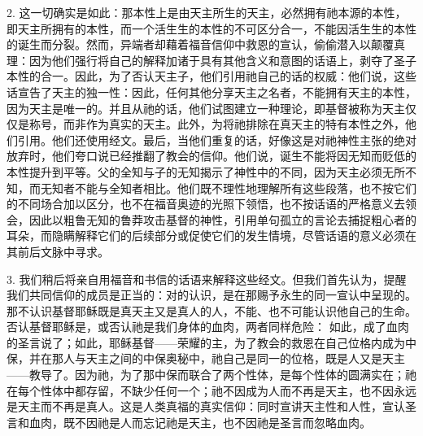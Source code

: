 2. 这一切确实是如此：那本性上是由天主所生的天主，必然拥有祂本源的本性，即天主所拥有的本性，而一个活生生的本性的不可区分合一，不能因活生生的本性的诞生而分裂。然而，异端者却藉着福音信仰中救恩的宣认，偷偷潜入以颠覆真理：因为他们强行将自己的解释加诸于具有其他含义和意图的话语上，剥夺了圣子本性的合一。因此，为了否认天主子，他们引用祂自己的话的权威：他们说，这些话宣告了天主的独一性：因此，任何其他分享天主之名者，不能拥有天主的本性，因为天主是唯一的。并且从祂的话，他们试图建立一种理论，即基督被称为天主仅仅是称号，而非作为真实的天主。此外，为将祂排除在真天主的特有本性之外，他们引用。他们还使用经文。最后，当他们重复的话，好像这是对祂神性主张的绝对放弃时，他们夸口说已经推翻了教会的信仰。他们说，诞生不能将因无知而贬低的本性提升到平等。父的全知与子的无知揭示了神性中的不同，因为天主必须无所不知，而无知者不能与全知者相比。他们既不理性地理解所有这些段落，也不按它们的不同场合加以区分，也不在福音奥迹的光照下领悟，也不按话语的严格意义去领会，因此以粗鲁无知的鲁莽攻击基督的神性，引用单句孤立的言论去捕捉粗心者的耳朵，而隐瞒解释它们的后续部分或促使它们的发生情境，尽管话语的意义必须在其前后文脉中寻求。\par

3. 我们稍后将亲自用福音和书信的话语来解释这些经文。但我们首先认为，提醒我们共同信仰的成员是正当的：对的认识，是在那赐予永生的同一宣认中呈现的。那不认识基督耶稣既是真天主又是真人的人，不能、也不可能认识他自己的生命。否认基督耶稣是，或否认祂是我们身体的血肉，两者同样危险： 如此，成了血肉的圣言说了；如此，耶稣基督——荣耀的主，为了教会的救恩在自己位格内成为中保，并在那人与天主之间的中保奥秘中，祂自己是同一的位格，既是人又是天主——教导了。因为祂，为了那中保而联合了两个性体，是每个性体的圆满实在；祂在每个性体中都存留，不缺少任何一个；祂不因成为人而不再是天主，也不因永远是天主而不再是真人。这是人类真福的真实信仰：同时宣讲天主性和人性，宣认圣言和血肉，既不因祂是人而忘记祂是天主，也不因祂是圣言而忽略血肉。\par

